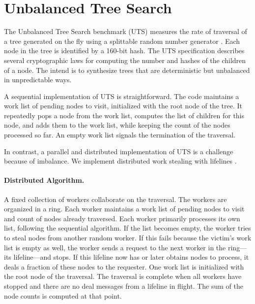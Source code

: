 \section{Unbalanced Tree Search}
\label{sec:uts}

The Unbalanced Tree Search benchmark (UTS) measures the rate of traversal of
a tree generated on the fly using a splittable random number
generator \cite{lcpc06}. Each node in the tree is identified by a 160-bit hash.
The UTS specification describes several cryptographic laws for computing the number and hashes of the children of a node.
The intend is to synthesize trees that are deterministic but unbalanced in unpredictable ways. 

A sequential implementation of UTS is straightforward. The code maintains a work list of pending nodes to visit, initialized with the root node of the tree. It repeatedly pops a node from the work list, computes the list of children for this node, and adds them to the work list, while keeping the count of the nodes processed so far. An empty work list signals the termination of the traversal.

In contrast, a parallel and distributed implementation of UTS is a challenge because of imbalance.
We implement distributed work stealing with lifelines \cite{ppopp11}.

\paragraph{Distributed Algorithm.} A fixed collection of workers collaborate on the traversal. The workers are organized in a ring.
Each worker maintains a work list of pending nodes to visit and count of nodes already traversed. Each worker primarily processes its own list, following the sequential algorithm. If the list becomes empty, the worker tries to steal nodes from another random worker. If this fails because the victim's work list is empty as well, the worker sends a request to the next worker in the ring---its lifeline---and stops. If this lifeline now has or later obtains nodes to process, it deals a fraction of these nodes to the requester. One work list is initialized with the root node of the traversal. The traversal is complete when all workers have stopped and there are no deal messages from a lifeline in flight. The sum of the node counts is computed at that point.

